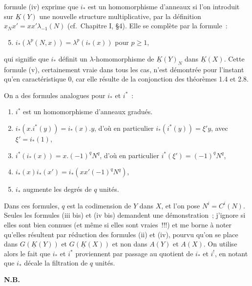 formule (iv) exprime que $i_*$ est un homomorphisme d'anneaux si l'on introduit sur $\underline K(Y)$ une nouvelle structure multiplicative, par la définition $x_N x'=xx'\lambda_{-1}(N)$ (cf.\ Chapitre I, \S 4). Elle se complète par la formule~:
\begin{enumerate}[label=(\roman*)]
\setcounter{enumi}{4}
\item $i_*(\lambda^p(N,x))=\lambda^p(i_*(x))$ pour $p\geq1$,
\end{enumerate}
qui signifie que $i_*$ définit un $\lambda$-homomorphisme de $\underline K(Y)_N$ dans $\underline K(X)$. Cette formule (v), certainement vraie dans tous les cas, n'est démontrée pour l'instant qu'en caractéristique $0$, car elle résulte de la conjonction des théorèmes 1.4 et 2.8.

On a des formules analogues pour $i_*$ et $i^*$~:
\begin{enumerate}[label=(\roman* bis)]
\item $i^*$ est un homomorphisme d'anneaux gradués.
\item $i_*(x.i^*(y))=i_*(x).y$, d'où en particulier $i_*(i^*(y))=\xi' y$, avec $\xi'=i_*(1)$,
\item $i^*(i_*(x))=x.(-1)^q N^q$, d'où en particulier $i^*(\xi')=(-1)^q N^q$,
\item $i_*(x)i_*(x')=i_*(xx'(-1)^q N^q)$,
\item $i_*$ augmente les degrés de $q$ unités.
\end{enumerate}
Dans ces formules, $q$ est la codimension de $Y$ dans $X$, et l'on pose $N^i=C^i(N)$. Seules les formules (iii bis) et (iv bis) demandent une démonstration~; j'ignore si elles sont bien connues (et même si elles sont vraies~!!!) et me borne à noter qu'elles résultent par réduction des formules (ii) et (iv), pourvu qu'on se place dans $G(\underline K(Y))$ et $G(\underline K(X))$ et non dans $A(Y)$ et $A(X)$. On utilise alors le fait que $i_*$ et $i^*$ proviennent par passage au quotient de $i_*$ et $i^!$, en notant que $i_*$ décale la filtration de $q$ unités.

\textbf{N.B.}

